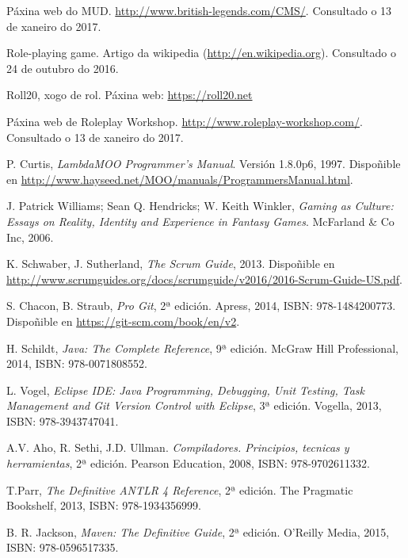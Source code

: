 

\begin{thebibliography}{99}

 Páxina web do MUD. \url{http://www.british-legends.com/CMS/}.
Consultado o 13 de xaneiro do 2017.

 Role-playing game. Artigo da wikipedia
(\url{http://en.wikipedia.org}).
Consultado o 24 de outubro do 2016.

 Roll20, xogo de rol. Páxina web: \url{https://roll20.net}

 Páxina web de Roleplay Workshop. \url{
http://www.roleplay-workshop.com/}. Consultado o 13 de xaneiro do 2017.

 P. Curtis, \textit{LambdaMOO Programmer's Manual}.
Versión 1.8.0p6, 1997.
Dispoñible en \url{http://www.hayseed.net/MOO/manuals/ProgrammersManual.html}.

 J. Patrick Williams; Sean Q. Hendricks; W. Keith
Winkler, \textit{Gaming as Culture: Essays on Reality, Identity and Experience in
Fantasy Games}. McFarland \& Co Inc, 2006.

 K. Schwaber, J. Sutherland, \textit{The Scrum Guide},
2013. Dispoñible en \url{
http://www.scrumguides.org/docs/scrumguide/v2016/2016-Scrum-Guide-US.pdf}.

 S. Chacon, B. Straub, \textit{Pro Git}, 2ª edición. Apress, 2014,
ISBN: 978-1484200773.
Dispoñible en \url{https://git-scm.com/book/en/v2}.

 H. Schildt, \textit{Java: The Complete Reference}, 9ª edición.
McGraw Hill Professional, 2014, ISBN: 978-0071808552.

 L. Vogel, \textit{Eclipse IDE: Java Programming, Debugging,
Unit Testing, Task Management and Git Version Control with Eclipse}, 3ª edición.
Vogella, 2013, ISBN: 978-3943747041.

 A.V. Aho, R. Sethi, J.D. Ullman. \textit{Compiladores.
Principios, tecnicas y herramientas}, 2ª edición. Pearson Education, 2008, ISBN:
978-9702611332.

 T.Parr, \textit{The Definitive ANTLR 4 Reference}, 2ª edición.
The Pragmatic Bookshelf, 2013, ISBN: 978-1934356999.

 B. R. Jackson, \textit{Maven: The Definitive Guide}, 2ª
edición. O'Reilly Media, 2015, ISBN: 978-0596517335.


\end{thebibliography}
